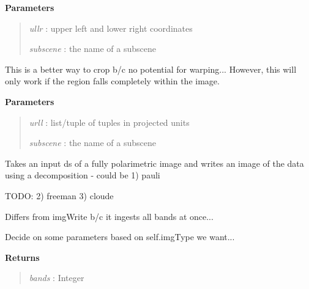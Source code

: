 \documentclass[letterpaper,10pt,english]{sphinxmanual}
\begin{document}
\begin{fulllineitems}
\begin{fulllineitems}
\textbf{Parameters}
\begin{quote}

\emph{ullr}     : upper left and lower right coordinates

\emph{subscene} : the name of a subscene
\end{quote}

\end{fulllineitems}


\begin{fulllineitems}
\label{code:Image.Image.cropSmall}
This is a better way to crop b/c no potential for warping...
However, this will only work if the region falls completely within the image.

\textbf{Parameters}
\begin{quote}

\emph{urll}     : list/tuple of tuples in projected units

\emph{subscene} : the name of a subscene
\end{quote}

\end{fulllineitems}


\begin{fulllineitems}
\label{code:Image.Image.decomp}
Takes an input ds of a fully polarimetric image and writes an image of
the data using a decomposition - could be 1) pauli

TODO: 2) freeman 3) cloude

Differs from imgWrite b/c it ingests all bands at once...

\end{fulllineitems}


\begin{fulllineitems}
\label{code:Image.Image.fnameGenerate}
Decide on some parameters based on self.imgType we want...

\textbf{Returns}
\begin{quote}

\emph{bands}    : Integer


\end{quote}
\end{fulllineitems}
\end{fulllineitems}
\end{document}
